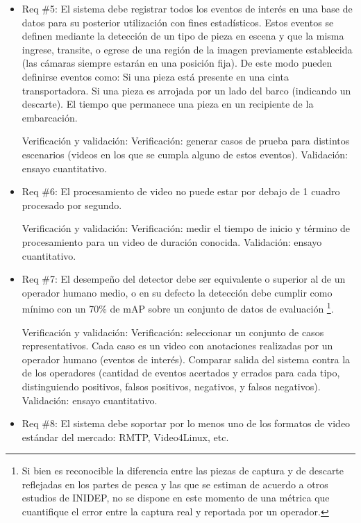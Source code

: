\documentclass[11pt]{charter}
\begin{document}
\begin{itemize}
\item Req \#5: El sistema debe registrar todos los eventos de interés en una base de datos para su posterior utilización con fines estadísticos. Estos eventos se definen mediante la detección de un tipo de pieza en escena y que la misma ingrese, transite, o egrese de una región de la imagen previamente establecida (las cámaras siempre estarán en una posición fija). De este modo pueden definirse eventos como:
			\subitem Si una pieza está presente en una cinta transportadora.
			\subitem Si una pieza es arrojada por un lado del barco (indicando un descarte).
			\subitem El tiempo que permanece una pieza en un recipiente de la embarcación.

Verificación y validación:
\subitem Verificación: generar casos de prueba para distintos escenarios (videos en los que se cumpla alguno de estos eventos).
\subitem Validación: ensayo cuantitativo.

\item Req \#6: El procesamiento de video no puede estar por debajo de 1 cuadro procesado por segundo.

Verificación y validación:
\subitem Verificación: medir el tiempo de inicio y término de procesamiento para un video de duración conocida.
\subitem Validación: ensayo cuantitativo.

\item Req \#7: El desempeño del detector debe ser equivalente o superior al de un operador humano medio, o en su defecto la detección debe cumplir como mínimo con un 70\% de mAP sobre un conjunto de datos de evaluación \footnote{Si bien es reconocible la diferencia entre las piezas de captura y de descarte reflejadas en los partes de pesca y las que se estiman de acuerdo a otros estudios de INIDEP, no se dispone en este momento de una métrica que cuantifique el error entre la captura real y reportada por un operador.}.

Verificación y validación:
\subitem Verificación: seleccionar un conjunto de casos representativos. Cada caso es un video con anotaciones realizadas por un operador humano (eventos de interés). Comparar salida del sistema contra la de los operadores (cantidad de eventos acertados y errados para cada tipo, distinguiendo positivos, falsos positivos, negativos, y falsos negativos).
\subitem Validación: ensayo cuantitativo.

\item Req \#8: El sistema debe soportar por lo menos uno de los formatos de video estándar del mercado: RMTP, Video4Linux, etc.


\end{itemize}
\end{document}
